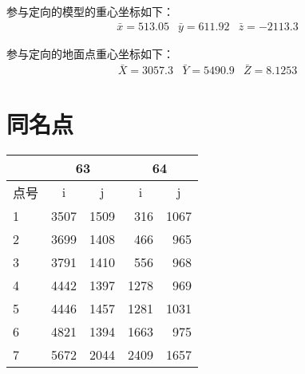 参与定向的模型的重心坐标如下：
\begin{equation}
\begin{array}{lll}
\bar x=513.05 & \bar y=611.92 & \bar z=-2113.3
\end{array}   
\end{equation}

参与定向的地面点重心坐标如下：
\begin{equation}
\begin{array}{lll}
\bar X=3057.3 & \bar Y=5490.9 & \bar Z=8.1253
\end{array}
\end{equation}


\section{同名点}





     
     
    
  

\begin{table}[htbp]
\centering
\begin{tabular}{lrrrr}
    \toprule
    & \multicolumn{2}{c}{63} & \multicolumn{2}{c}{64} \\ \hline
    点号 & \multicolumn{1}{c}{i} & \multicolumn{1}{c}{j} & \multicolumn{1}{c}{i} & \multicolumn{1}{c}{j} \\ \midrule
    1  & 3507 & 1509 & 316 & 1067 \\
    2  & 3699 & 1408 & 466 & 965 \\
    3  & 3791 & 1410 & 556 & 968 \\
    4  & 4442 & 1397 & 1278 & 969 \\
    5  & 4446 & 1457 & 1281 & 1031 \\
    6  & 4821 & 1394 & 1663 & 975 \\
    7  & 5672 & 2044 & 2409 & 1657 \\ \bottomrule
\end{tabular}
\end{table}
  



